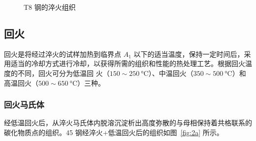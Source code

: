\documentclass[a4paper,utf8]{article}
\newcommand{\fgref}[1]{图~\ref{#1}\xspace}
\begin{document}
            \begin{figure}[!ht]
                \centering
                \hspace{20pt}
                \hspace{20pt}
                \caption{T8 钢的淬火组织\label{fig:2}}
            \end{figure}
    \subsection{回火}
        回火是将经过淬火的试样加热到临界点 $A_1$ 以下的适当温度，保持一定时间后，采用适当的冷却方式进行冷却，以获得所需的组织和性能的热处理工艺。根据回火温度的不同，回火可分为低温回
        火（$150 \sim 250~\unit{\degreeCelsius}$）、中温回火（$350 \sim 500~\unit{\degreeCelsius}$）和高温回火（$500 \sim 650~\unit{\degreeCelsius}$）三种。
            \subsubsection{回火马氏体}
                经低温回火后，从淬火马氏体内脱溶沉淀析出高度弥散的与母相保持着共格联系的碳化物质点的组织。45 钢经淬火+低温回火后的组织如\fgref{fig:2a} 所示。
\end{document}
